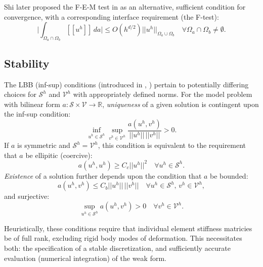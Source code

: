 	Shi later proposed the F-E-M test in \cite{Shi:87} as an alternative, sufficient condition for convergence, with a corresponding interface requirement (the F-test):
	\begin{equation}
		\bigg| \int_{\Omega_a \cap \Omega_b} [\![ u^h ]\!] \, da \bigg| \leq O(h^{d/2}) ||u^h||_{\Omega_a \cup \Omega_b} \quad \forall \Omega_a \cap \Omega_b \neq \emptyset.
	\end{equation}
	
	
\subsection*{Stability}

	The LBB (inf-sup) conditions (introduced in \cite{Babuska:71}, \cite{Brezzi:74}) pertain to potentially differing choices for $\mathcal{S}^h$ and $\mathcal{V}^h$ with appropriately defined norms. For the model problem with bilinear form $a \colon \mathcal{S} \times \mathcal{V} \rightarrow \mathbb{R}$, \textit{uniqueness} of a given solution is contingent upon the inf-sup condition:
	\begin{equation}
		\inf_{u^h \in \mathcal{S}^h} \sup_{v^h \in 
\mathcal{V}^h} \frac{a(u^h,v^h)}{||u^h|| \, ||v^h||} > 0.
	\end{equation}
	If $a$ is symmetric and $\mathcal{S}^h = \mathcal{V}^h$, this condition is equivalent to the requirement that $a$ be ellipitic (coercive):
	\begin{equation}
		a(u^h,u^h) \geq C_c ||u^h||^2 \quad \forall u^h \in \mathcal{S}^h.
	\end{equation}
	\textit{Existence} of a solution further depends upon the condition that $a$ be bounded:
	\begin{equation}
		a(u^h,v^h) \leq C_b ||u^h|| \, ||v^h|| \quad \forall u^h \in \mathcal{S}^h, \, v^h \in \mathcal{V}^h,
	\end{equation}
	and surjective:
	\begin{equation}
		\sup_{u^h \in 
\mathcal{S}^h} a(u^h,v^h) > 0 \quad \forall v^h \in \mathcal{V}^h.
	\end{equation}
	
	Heuristically, these conditions require that individual element stiffness matricies be of full rank, excluding rigid body modes of deformation. This necessitates both: the specification of a stable discretization, and sufficiently accurate evaluation (numerical integration) of the weak form.
	
